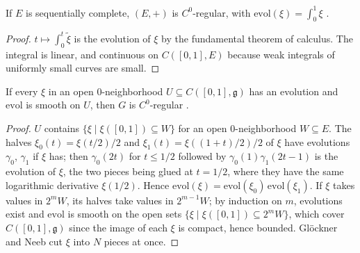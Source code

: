 \begin{proposition}
  \label{prop:vector-regular}
  \leanok
  If $E$ is sequentially complete, $(E, +)$ is $C^0$-regular, with
  $\mathrm{evol}(\xi) = \int_0^1 \xi$ \cite[Proposition 6.1.3]{GN26}.
\end{proposition}

\begin{proof}
  \leanok
  $t \mapsto \int_0^t \tilde\xi$ is the evolution of $\xi$ by the fundamental theorem of calculus.
  The integral is linear, and continuous on $C([0, 1], E)$ because weak integrals of uniformly
  small curves are small.
\end{proof}

\begin{lemma}
  \label{lem:local-regularity}
  \leanok
  If every $\xi$ in an open $0$-neighborhood $U \subseteq C([0, 1], \mathfrak g)$ has an evolution
  and $\mathrm{evol}$ is smooth on $U$, then $G$ is $C^0$-regular \cite[Lemma 6.1.4]{GN26}.
\end{lemma}

\begin{proof}
  \leanok
  $U$ contains $\{\xi \mid \xi([0, 1]) \subseteq W\}$ for an open $0$-neighborhood $W \subseteq E$.
  The halves $\xi_0(t) = \xi(t/2)/2$ and $\xi_1(t) = \xi((1 + t)/2)/2$ of $\xi$ have evolutions
  $\gamma_0$, $\gamma_1$ if $\xi$ has; then $\gamma_0(2t)$ for $t \leq 1/2$ followed by
  $\gamma_0(1)\gamma_1(2t - 1)$ is the evolution of $\xi$, the two pieces being glued at $t = 1/2$,
  where they have the same logarithmic derivative $\xi(1/2)$. Hence
  $\mathrm{evol}(\xi) = \mathrm{evol}(\xi_0)\,\mathrm{evol}(\xi_1)$. If $\xi$ takes values in
  $2^m W$, its halves take values in $2^{m-1} W$; by induction on $m$, evolutions exist and
  $\mathrm{evol}$ is smooth on the open sets $\{\xi \mid \xi([0, 1]) \subseteq 2^m W\}$, which cover
  $C([0, 1], \mathfrak g)$ since the image of each $\xi$ is compact, hence bounded. Glöckner and
  Neeb cut $\xi$ into $N$ pieces at once.
\end{proof}

